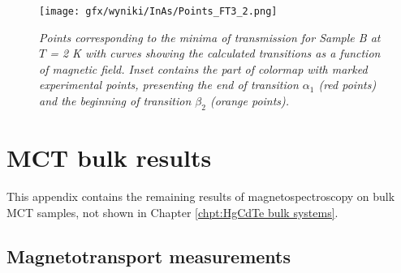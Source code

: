 \documentclass[titlepage,a4paper]{book}
\newcommand{\wciecie}{\quad\phantom{v}}
\newcommand{\myparagraph}[1]{\paragraph{#1}\mbox{}\\}
\begin{document}
\begin{figure}[H]
	\centering
	\texttt{[image: gfx/wyniki/InAs/Points\_FT3\_2.png]}
	\vspace{-10pt}
	\caption{\textit{Points corresponding to the minima of transmission for Sample B at $T$ = 2 K with curves showing the calculated transitions as a function of magnetic field. Inset contains the part of colormap with marked experimental points, presenting the end of transition $\alpha_1$ (red points) and the beginning of transition $\beta_2$ (orange points). }}
	\label{fig:Points_FT3}
\end{figure}

\iffalse
\myparagraph{Sample C}
\begin{figure}[H]
	\centering
	\texttt{[image: gfx/wyniki/InAs/LL\_new.png]}
	\vspace{-10pt}
	\caption{\textit{Landau level graph of Sample C as a function of magnetic field at $T$ = 2 K. Vertical arrows with a corresponding Greek letter represent observed transitions between Landau levels in this system. Solid arrows ($\alpha$ and $\beta$) are interband transitions.}}
	\label{fig:LL_new}
\end{figure}

\begin{figure}[H]
	\centering
	\texttt{[image: gfx/wyniki/InAs/Points\_new.png]}
	\vspace{-10pt}
	\caption{\textit{Points corresponding to the minima of transmission for Sample C at $T$ = 2 K with curves showing the calculated transitions as a function of magnetic field.}}
	\label{fig:Points_new}
\end{figure}
\fi


\chapter{MCT bulk results}
\label{Appendix_bulk}
\wciecie
This appendix contains the remaining results of magnetospectroscopy on bulk MCT samples, not shown in Chapter \ref{chpt:HgCdTe bulk systems}.


\section{Magnetotransport measurements}
\end{document}
